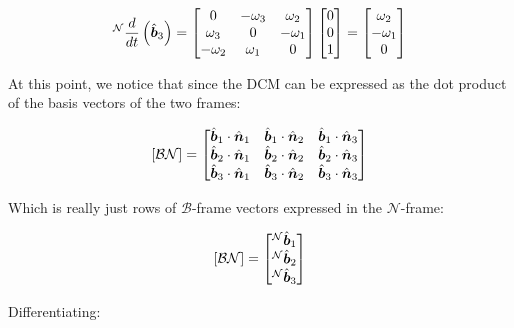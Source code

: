 \begin{align*}
    {}^\mathcal{N}\frac{d}{dt}\left(\hat{\boldsymbol{b}}_3\right) &= \begin{bmatrix}
            0 & -\omega_3 & \omega_2 \\
            \omega_3 & 0 & -\omega_1 \\
            -\omega_2 & \omega_1 & 0 \\
        \end{bmatrix}
        \begin{bmatrix}
            0 \\ 0 \\ 1
        \end{bmatrix} = \begin{bmatrix}
            \omega_2 \\ -\omega_1 \\ 0
        \end{bmatrix} \\
\end{align*}

At this point, we notice that since the DCM can be expressed as the dot product of the basis vectors of the two frames:

\begin{equation}
    \left[\mathcal{BN}\right] = \begin{bmatrix}
        \hat{\boldsymbol{b}}_1 \cdot \hat{\boldsymbol{n}}_1 & \hat{\boldsymbol{b}}_1 \cdot \hat{\boldsymbol{n}}_2 & \hat{\boldsymbol{b}}_1 \cdot \hat{\boldsymbol{n}}_3 \\
        \hat{\boldsymbol{b}}_2 \cdot \hat{\boldsymbol{n}}_1 & \hat{\boldsymbol{b}}_2 \cdot \hat{\boldsymbol{n}}_2 & \hat{\boldsymbol{b}}_2 \cdot \hat{\boldsymbol{n}}_3 \\
        \hat{\boldsymbol{b}}_3 \cdot \hat{\boldsymbol{n}}_1 & \hat{\boldsymbol{b}}_3 \cdot \hat{\boldsymbol{n}}_2 & \hat{\boldsymbol{b}}_3 \cdot \hat{\boldsymbol{n}}_3 \\
    \end{bmatrix}
\end{equation}

Which is really just rows of $\mathcal{B}$-frame vectors expressed in the $\mathcal{N}$-frame:

\begin{equation}
    \left[\mathcal{BN}\right] = \begin{bmatrix}
        {}^\mathcal{N}\hat{\boldsymbol{b}}_1 \\ {}^\mathcal{N}\hat{\boldsymbol{b}}_2 \\ {}^\mathcal{N}\hat{\boldsymbol{b}}_3 \\
    \end{bmatrix}
\end{equation}

Differentiating:

